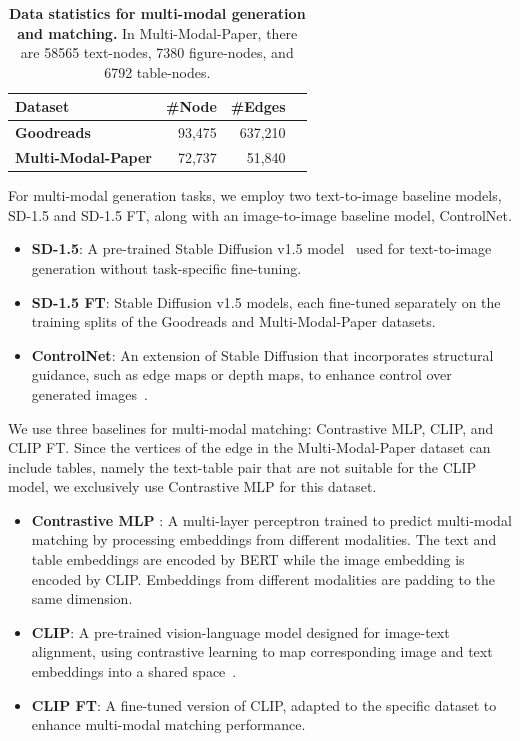 \begin{table}[ht]
	\centering
    \caption{\textbf{Data statistics for multi-modal generation and matching.} In Multi-Modal-Paper, there are 58565 text-nodes, 7380 figure-nodes, and 6792 table-nodes.}
	\begin{tabular}{lrrr}
		\toprule
		\textbf{Dataset} & \textbf{\#Node} & \textbf{\#Edges} \\
		\midrule
		\textbf{Goodreads} &  93,475 & 637,210\\
		\textbf{Multi-Modal-Paper} & 72,737 &51,840\\
		\bottomrule
	\end{tabular}
	\label{tab:multimodal_data}%
\end{table}

For multi-modal generation tasks, we employ two text-to-image baseline models, SD-1.5 and SD-1.5 FT, along with an image-to-image baseline model, ControlNet.


 \begin{itemize}[leftmargin=1em, itemsep=0pt] 
 \item \textbf{SD-1.5}: A pre-trained Stable Diffusion v1.5 model~\cite{rombach2022high} used for text-to-image generation without task-specific fine-tuning.
\item  \textbf{SD-1.5 FT}: Stable Diffusion v1.5 models, each fine-tuned separately on the training splits of the Goodreads and Multi-Modal-Paper datasets.
\item \textbf{ControlNet}: An extension of Stable Diffusion that incorporates structural guidance, such as edge maps or depth maps, to enhance control over generated images~\cite{zhang2023adding}.
 \end{itemize} 

We use three baselines for multi-modal matching: Contrastive MLP, CLIP, and CLIP FT. Since the vertices of the edge in the Multi-Modal-Paper dataset can include tables, namely the text-table pair that are not suitable for the CLIP model, we exclusively use Contrastive MLP for this dataset.
 \begin{itemize}[leftmargin=1em, itemsep=0pt] 
 \item \textbf{Contrastive MLP} \citep{liu2022mlp}: A multi-layer perceptron trained to predict multi-modal matching by processing embeddings from different modalities. The text and table embeddings are encoded by BERT while the image embedding is encoded by CLIP. Embeddings from different modalities are padding to the same dimension.
\item  \textbf{CLIP}: A pre-trained vision-language model designed for image-text alignment, using contrastive learning to map corresponding image and text embeddings into a shared space~\cite{radford2021learning}.
\item \textbf{CLIP FT}: A fine-tuned version of CLIP, adapted to the specific dataset to enhance multi-modal matching performance.
 \end{itemize} 


